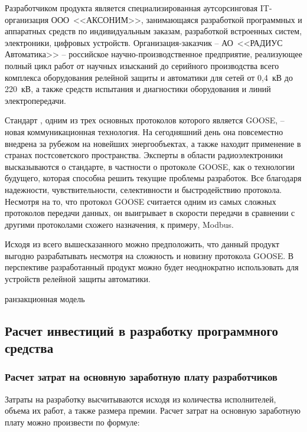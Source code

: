 Разработчиком продукта является специализированная аутсорсинговая IT-организация
ООО~<<АКСОНИМ>>, занимающаяся разработкой программных и аппаратных средств
по индивидуальным заказам, разработкой встроенных систем, электроники,
цифровых устройств. Организация-заказчик -- АО~<<РАДИУС Автоматика>> --
российское научно-производственное предприятие, реализующее полный цикл работ
от научных изысканий до серийного производства всего комплекса оборудования
релейной защиты и автоматики для сетей от 0,4~кВ до 220~кВ, а также средств испытания
и диагностики оборудования и линий электропередачи.

Стандарт , одним из трех основных протоколов которого является GOOSE,
-- новая коммуникационная технология. На сегодняшний день она повсеместно внедрена
за рубежом на новейших энергообъектах, а также находит применение в странах
постсоветского пространства. Эксперты в области радиоэлектроники высказываются
о стандарте, в частности о протоколе GOOSE, как о технологии будущего,
которая способна решить текущие проблемы разработок. Все благодаря надежности,
чувствительности, селективности и быстродействию протокола. Несмотря на то, что
протокол GOOSE считается одним из самых сложных протоколов передачи данных,
он выигрывает в скорости передачи в сравнении с другими протоколами схожего
назначения, к примеру, Modbus.

Исходя из всего вышесказанного можно предположить, что данный продукт выгодно
разрабатывать несмотря на сложность и новизну протокола GOOSE. В перспективе
разработанный продукт можно будет неоднократно использовать для устройств релейной
защиты автоматики.

ранзакционная модель

\subsection{Расчет инвестиций в разработку программного средства}

\subsubsection{Расчет затрат на основную заработную плату разработчиков}

Затраты на разработку высчитываются исходя из количества исполнителей, объема их
работ, а также размера премии. Расчет затрат на основную заработную плату можно
произвести по формуле:

